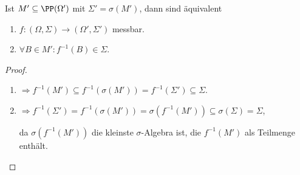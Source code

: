 \begin{prop}[Vereinfachung]
\label{prop:3.17}
Ist $M'\subseteq \PP(\Omega')$ mit $\Sigma' = \sigma(M')$, dann sind äquivalent
\begin{enumerate}[label=(\roman{*})]
  \item $f: (\Omega,\Sigma)\to(\Omega',\Sigma')$ messbar.
  \item $\forall B\in M' : f^{-1}(B) \in \Sigma$.\fishhere
\end{enumerate}
\end{prop}
\begin{proof}
\begin{enumerate}[label=(\roman{*})]
  \item $\Rightarrow f^{-1}(M')\subseteq f^{-1}(\sigma(M')) =
  f^{-1}(\Sigma')\subseteq \Sigma$.
  \item $\Rightarrow f^{-1}(\Sigma') = f^{-1}(\sigma(M'))  =
  \sigma(f^{-1}(M'))\subseteq \sigma(\Sigma) = \Sigma$,
  
  da $\sigma(f^{-1}(M'))$ die kleinste $\sigma$-Algebra ist, die $f^{-1}(M')$
  als Teilmenge enthält.\qedhere
\end{enumerate}
\end{proof}

